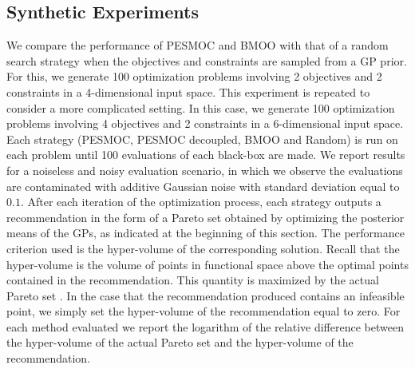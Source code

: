 \documentclass[review,preprint,12pt]{elsarticle}
\providecommand{\DIFaddbegin}{} %
\providecommand{\DIFaddend}{} %
\begin{document}
\DIFaddbegin 

\DIFaddend \subsection{Synthetic Experiments}

We compare the performance of PESMOC and BMOO with that of a random search strategy when the objectives and 
constraints are sampled from a GP prior. For this, we generate 100 optimization problems involving 2 objectives 
and 2 constraints in a 4-dimensional input space. This experiment is repeated to consider a more complicated setting.
In this case, we generate 100 optimization problems involving 4 objectives and 2 constraints in a 6-dimensional input 
space.  Each strategy (PESMOC, PESMOC decoupled, BMOO and Random) is run on each problem until 100 evaluations of each 
black-box are made. We report results for a noiseless and noisy evaluation scenario, in which we observe the evaluations 
are contaminated with additive Gaussian noise with standard deviation equal to $0.1$.  After each iteration of the optimization
process, each strategy outputs a recommendation in the form of a Pareto set obtained by optimizing the posterior means of the GPs,
as indicated at the beginning of this section. The performance criterion used is the hyper-volume of the corresponding 
solution. Recall that  the hyper-volume is the volume of points in functional space above the optimal points contained
in the recommendation. This quantity is maximized by the actual Pareto set \citep{zitzler1999multiobjective}. 
In the case that the recommendation produced contains an infeasible point, we 
simply set the hyper-volume of the recommendation equal to zero. For each method evaluated we report the logarithm of 
the relative difference between the hyper-volume of the actual Pareto set and the hyper-volume of the recommendation. 
\end{document}
